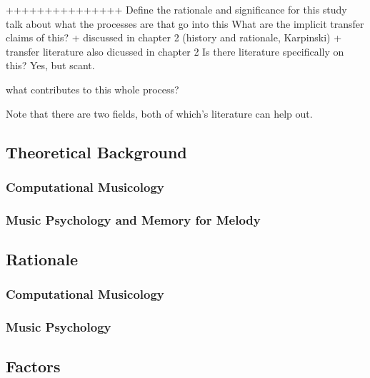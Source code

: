 \documentclass[]{book}
\theoremstyle{definition}
\theoremstyle{definition}
\theoremstyle{definition}
\theoremstyle{remark}
\begin{document}
+++++++++++++++ Define the rationale and significance for this study
talk about what the processes are that go into this What are the
implicit transfer claims of this? + discussed in chapter 2 (history and
rationale, Karpinski) + transfer literature also dicussed in chapter 2
Is there literature specifically on this? Yes, but scant.

what contributes to this whole process?

Note that there are two fields, both of which's literature can help out.

\hypertarget{theoretical-background}{%
\subsection{Theoretical Background}\label{theoretical-background}}

\hypertarget{computational-musicology}{%
\subsubsection{Computational
Musicology}\label{computational-musicology}}

\hypertarget{music-psychology-and-memory-for-melody}{%
\subsubsection{Music Psychology and Memory for
Melody}\label{music-psychology-and-memory-for-melody}}

\hypertarget{rationale}{%
\subsection{Rationale}\label{rationale}}

\hypertarget{computational-musicology-1}{%
\subsubsection{Computational
Musicology}\label{computational-musicology-1}}

\hypertarget{music-psychology}{%
\subsubsection{Music Psychology}\label{music-psychology}}

\hypertarget{factors}{%
\subsection{Factors}\label{factors}}
\end{document}
